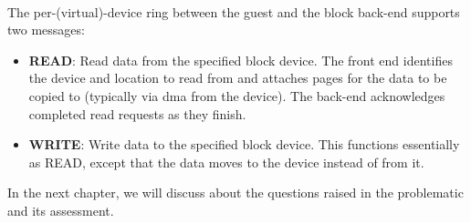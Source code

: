 \paragraph{} The per-(virtual)-device ring between the guest and the block back-end supports two messages:

\begin{itemize}
    \item \textbf{READ}: Read data from the specified block device. The front end identifies the device and location to read from and attaches pages for the data to be copied to (typically via \acrshort{dma} from the device). The back-end acknowledges completed read requests as they finish.
    \item \textbf{WRITE}: Write data to the specified block device. This functions essentially as READ, except that the data moves to the device instead of from it.


\end{itemize}


In the next chapter, we will discuss about the questions raised in the problematic and its assessment.
